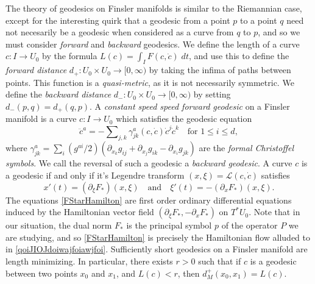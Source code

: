 The theory of geodesics on Finsler manifolds is similar to the Riemannian case, except for the interesting quirk that a geodesic from a point $p$ to a point $q$ need not necesarily be a geodesic when considered as a curve from $q$ to $p$, and so we must consider \emph{forward} and \emph{backward} geodesics. We define the length of a curve $c: I \to U_0$ by the formula $L(c) = \int_I F(c,\dot{c})\; dt$, and use this to define the \emph{forward distance} $d_+: U_0 \times U_0 \to [0,\infty)$ by taking the infima of paths between points. This function is a \emph{quasi-metric}, as it is not necessarily symmetric. We define the \emph{backward distance} $d_-: U_0 \times U_0 \to [0,\infty)$ by setting $d_-(p,q) = d_+(q,p)$. A \emph{constant speed speed forward geodesic} on a Finsler manifold is a curve $c: I \to U_0$ which satisfies the geodesic equation
%
%
\begin{equation} \label{geodesicequation}
    \ddot{c}^a = - \sum\nolimits_{j,k} \gamma^a_{jk}(c,\dot{c}) \dot{c}^j \dot{c}^k \quad\text{for $1 \leq i \leq d$},
\end{equation}
%
where $\gamma^a_{jk} = \sum_i (g^{ai}/2) ( \partial_{x_k} g_{ij} + \partial_{x_j} g_{ik} - \partial_{x_i} g_{jk} )$ are the \emph{formal Christoffel symbols}. %
%
%
We call the reversal of such a geodesic a \emph{backward geodesic}. A curve $c$ is a geodesic if and only if it's Legendre transform $(x,\xi) = \mathcal{L}(c,\dot{c})$ satisfies
%
\begin{equation} \label{FStarHamilton}
    x'(t) = (\partial_\xi F_*)(x,\xi) \quad\text{and}\quad \xi'(t) = - (\partial_x F_*)(x,\xi).
\end{equation}
%
The equations \eqref{FStarHamilton} are first order ordinary differential equations induced by the Hamiltonian vector field $( \partial_\xi F_*, - \partial_x F_* )$ on $T^* U_0$. Note that in our situation, the dual norm $F_*$ is the principal symbol $p$ of the operator $P$ we are studying, and so \eqref{FStarHamilton} is precisely the Hamiltonian flow alluded to in \eqref{qoiJIOJdoiwajfoiawjfoi}. Sufficiently short geodesics on a Finsler manifold are length minimizing. In particular, there exists $r > 0$ such that if $c$ is a geodesic between two points $x_0$ and $x_1$, and $L(c) < r$, then $d_M^+(x_0,x_1) = L(c)$.

